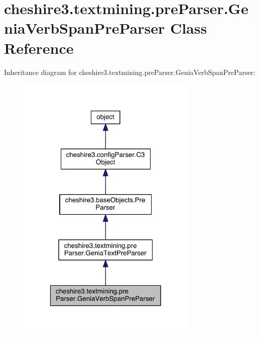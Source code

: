 \hypertarget{classcheshire3_1_1textmining_1_1pre_parser_1_1_genia_verb_span_pre_parser}{\section{cheshire3.\-textmining.\-pre\-Parser.\-Genia\-Verb\-Span\-Pre\-Parser Class Reference}
\label{classcheshire3_1_1textmining_1_1pre_parser_1_1_genia_verb_span_pre_parser}
}


Inheritance diagram for cheshire3.\-textmining.\-pre\-Parser.\-Genia\-Verb\-Span\-Pre\-Parser\-:
\nopagebreak
\begin{figure}[H]
\begin{center}
\leavevmode
\includegraphics[width=244pt]{classcheshire3_1_1textmining_1_1pre_parser_1_1_genia_verb_span_pre_parser__inherit__graph}
\end{center}
\end{figure}


